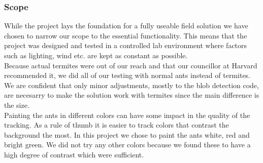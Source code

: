 

\subsubsection{Scope} \mbox{}\par



While the project lays the foundation for a fully useable field solution we have chosen to narrow our scope to the essential functionality. This means that the project was designed and tested in a controlled lab environment where factors such as lighting, wind etc. are kept as constant as possible. \\

Because actual termites were out of our reach and that our councillor at Harvard recommended it, we did all of our testing with normal ants instead of termites. We are confident that only minor adjustments, mostly to the blob detection code, are necesarry to make the solution work with termites since the main difference is the size. \\

Painting the ants in different colors can have some impact in the quality of the tracking. As a rule of thumb it is easier to track colors that contrast the background the most. In this project we chose to paint the ants white, red and bright green. We did not try any other colors because we found these to have a high degree of contrast which were sufficient.\\


